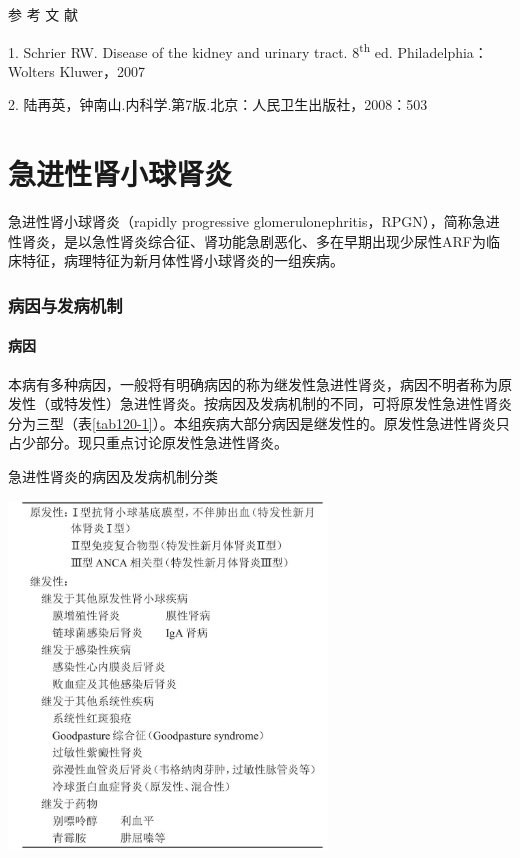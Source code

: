 \protect\hypertarget{text00339.html}{}{}

\hypertarget{text00339.htmlux5cux23CHP13-1-5}{}
参 考 文 献

1. Schrier RW. Disease of the kidney and urinary tract.
8\textsuperscript{th} ed. Philadelphia：Wolters Kluwer，2007

2. 陆再英，钟南山.内科学.第7版.北京：人民卫生出版社，2008：503

\protect\hypertarget{text00340.html}{}{}

\chapter{急进性肾小球肾炎}

急进性肾小球肾炎（rapidly progressive
glomerulonephritis，RPGN），简称急进性肾炎，是以急性肾炎综合征、肾功能急剧恶化、多在早期出现少尿性ARF为临床特征，病理特征为新月体性肾小球肾炎的一组疾病。

\subsection{病因与发病机制}

\subsubsection{病因}

本病有多种病因，一般将有明确病因的称为继发性急进性肾炎，病因不明者称为原发性（或特发性）急进性肾炎。按病因及发病机制的不同，可将原发性急进性肾炎分为三型（表\ref{tab120-1}）。本组疾病大部分病因是继发性的。原发性急进性肾炎只占少部分。现只重点讨论原发性急进性肾炎。

\begin{table}[htbp]
\centering
\caption{急进性肾炎的病因及发病机制分类}
\label{tab120-1}
\includegraphics[width=3.33333in,height=3.63542in]{./images/Image00496.jpg}
\end{table}

